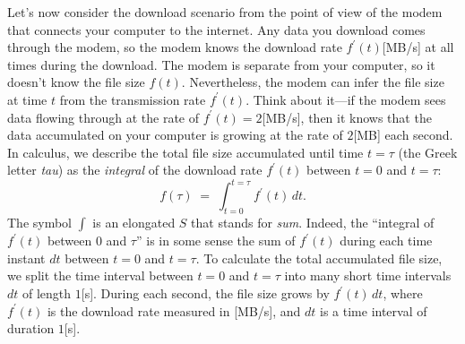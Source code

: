 		Let's now consider the download scenario
		from the point of view of the modem that connects your computer to the internet.
		Any data you download comes through the modem,
		so the modem knows the download rate $f^{\prime\!}(t)$[MB/s]
		at all times during the download.
		The modem is separate from your computer,
		so it doesn't know the file size $f(t)$.
		Nevertheless,
		the modem can infer the file size at time $t$
		from the transmission rate $f^{\prime\!}(t)$.
		Think about it---if the modem sees data flowing through at the rate of $f^{\prime\!}(t)=2$[MB/s],
		then it knows that the data accumulated on your computer
		is growing at the rate of $2$[MB] each second.
		In calculus,
		we describe the total file size accumulated until time $t=\tau$ (the Greek letter \emph{tau})
		as the \emph{integral} of the download rate $f^{\prime\!}(t)$ between $t=0$ and $t=\tau$:
		\[
			f(\tau) \; = \; \int_{t=0}^{t=\tau}  f^{\prime\!}(t)\, dt.
		\]
		The symbol $\int$ is an elongated $S$ that stands for \emph{sum}.
		Indeed,
		the ``integral of $f^{\prime\!}(t)$ between $0$ and $\tau$''
		is in some sense the sum of $f^{\prime\!}(t)$
		during each time instant $dt$ between $t=0$ and $t=\tau$.
		To calculate the total accumulated file size,
		we split the time interval between $t=0$ and $t=\tau$
		into many short time intervals $dt$ of length $1$[s].
		During each second,
		the file size grows by $f^{\prime\!}(t)\,dt$,
		where $f^{\prime\!}(t)$ is the download rate measured in [MB/s],
		and $dt$ is a time interval of duration $1$[s].

